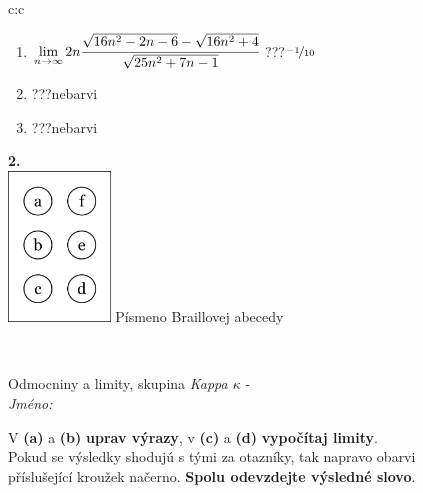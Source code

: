 \documentclass[10pt]{report}
\begin{document}
\begin{tabular}{c:c}
\begin{minipage}[c][104.5mm][t]{0.5\linewidth}
\begin{center}
\begin{minipage}{0.79\linewidth}
\begin{center}
\begin{varwidth}{\linewidth}
\begin{enumerate}
\item $\lim\limits_{n\to\infty}2n\cfrac{\sqrt{16n^2-2n-6}-\sqrt{16n^2+4}}{\sqrt{25n^2+7n-1}}$\quad \dotfill\; ???\;\dotfill \quad $\nicefrac{-1}{10}$
\item \quad \dotfill\; ???\;\dotfill \quad nebarvi
\item \quad \dotfill\; ???\;\dotfill \quad nebarvi
\end{enumerate}
\end{varwidth}
\end{center}
\end{minipage}
\begin{minipage}{0.20\linewidth}
\begin{center}
{\Huge\bfseries 2.} \\[2mm]
\includegraphics[height=40mm]{../images/braille.png}
{\small Písmeno Braillovej abecedy}
\end{center}
\end{minipage}
\end{center}
\end{minipage}
\\ \hdashline
\begin{minipage}[c][104.5mm][t]{0.5\linewidth}
\begin{center}
\vspace{7mm}
{\huge Odmocniny a limity, skupina \textit{Kappa $\kappa$} -}\\[5mm]
\textit{Jméno:}\phantom{xxxxxxxxxxxxxxxxxxxxxxxxxxxxxxxxxxxxxxxxxxxxxxxxxxxxxxxxxxxxxxxxx}\\[5mm]
\begin{minipage}{0.95\linewidth}
\begin{center}
V \textbf{(a)} a \textbf{(b)} \textbf{uprav výrazy}, v \textbf{(c)} a \textbf{(d)} \textbf{vypočítaj limity}.\\Pokud se výsledky shodujú s tými za otazníky, tak napravo obarvi\\příslušející kroužek načerno. \textbf{Spolu odevzdejte výsledné slovo}.
\end{center}
\end{minipage}
\\[1mm]

\end{center}
\end{minipage}
\end{tabular}
\end{document}
